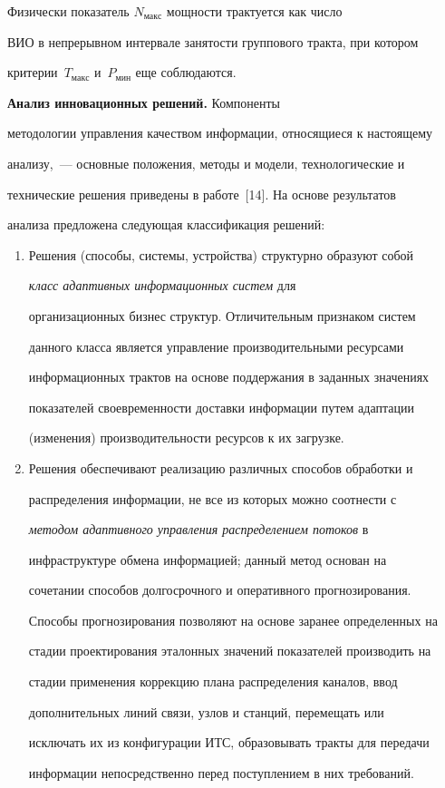 Физически показатель $N_{\mathrm{макс}}$ мощ\-ности трактуется как чис\-ло 


ВИО в непрерывном интервале занятости группового тракта, при котором 


критерии~$T_{\mathrm{макс}}$ и~$P_{\mathrm{мин}}$ еще соблюдаются.


        


        \smallskip


        \textbf{Анализ инновационных решений.} Компоненты 


методологии управления качеством информации, относящиеся к настоящему 


анализу,~--- основные положения, методы и модели, технологические и 


технические решения приведены в работе~[14].  На основе результатов 


анализа предложена следующая классификация решений:


        \begin{enumerate}[1.]


\item Решения (способы, системы, устройства) структурно образуют собой 


\textit{класс адаптивных информационных сис\-тем} для 


организационных бизнес структур. Отличительным признаком систем 


данного класса является управление производительными ресурсами 


информационных трактов на основе поддержания в заданных значениях 


показателей своевременности доставки информации путем адаптации 


(изменения) производительности ресурсов к их загрузке.


\item Решения обеспечивают реализацию различных способов обработки и 


распределения информации, не все из которых можно соотнести с 


\textit{методом адаптивного управления распределением потоков} в 


инфраструктуре обмена информацией; данный метод основан на 


сочетании способов долгосрочного и оперативного прогнозирования. 


Способы прогнозирования позволяют на основе заранее определенных на 


стадии проектирования эталонных значений показателей производить на 


стадии применения коррекцию плана распределения каналов, ввод 


дополнительных линий связи, узлов и станций, перемещать или 


исключать их из конфигурации ИТС, образовывать тракты для передачи 


информации непосредственно перед поступлением в них требований.


\end{enumerate}





